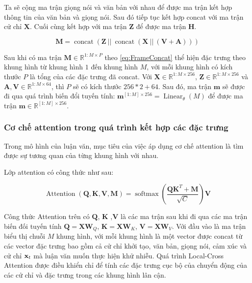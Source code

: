 Ta sẽ cộng ma trận giọng nói và văn bản với nhau để được ma trận kết hợp thông tin của văn bản và giọng nói. Sau đó tiếp tục kết hợp concat với ma trận cử chỉ $\mathbf{X}$. Cuối cùng kết hợp với ma trận $\mathbf{Z}$ để được ma trận $\mathbf{H}$.

\begin{equation}
	\label{eq:FrameConcat}
	\mathbf{M} = \operatorname{concat}( \mathbf{Z}\  || \   \operatorname{concat}(\mathbf{X}\ || \  (\mathbf{V} + \mathbf{A}) ) )
\end{equation}

Sau khi có ma trận $\mathbf{M} \in \mathbb{R}^{1:M \times P}$ theo \autoref{eq:FrameConcat} thể hiện đặc trưng theo khung hình từ khung hình $1$ đến khung hình $M$, với mỗi khung hình có kích thước $P$ là tổng của các đặc trưng đã concat. Với $\mathbf{X} \in \mathbb{R}^{1:M \times 256}$, $\mathbf{Z} \in \mathbb{R}^{1:M \times 256}$ và $\mathbf{A}, \mathbf{V} \in \mathbb{R}^{1:M \times 64}$, thì $P$ sẽ có kích thước $256 * 2 + 64$. Sau đó, ma trận $\mathbf{m}$ sẽ được đi qua quá trình biến đổi tuyến tính: $\mathbf{m}^{[1:M] \times 256} = \operatorname{Linear}_{\theta}(M)$ để được ma trận $\mathbf{m} \in \mathbb{R}^{[1:M] \times 256}$.

\subsubsection{Cơ chế attention trong quá trình kết hợp các đặc trưng}

Trong mô hình của luận văn, mục tiêu của việc áp dụng cơ chế attention là tìm được sự tương quan của từng khung hình với nhau.

Lớp attention có công thức như sau:

\begin{equation} \label{eq:attention}
	\operatorname{Attention}(\mathbf{Q}, \mathbf{K}, \mathbf{V}, \mathbf{M})=\operatorname{softmax}\left(\frac{\mathbf{Q} \mathbf{K}^{T}+\mathbf{M}}{\sqrt{C}}\right) \mathbf{V}
\end{equation}

Công thức Attention trên có $\mathbf{Q}$, $\mathbf{K}$ ,$\mathbf{V}$ là các ma trận sau khi đi qua các ma trận biến đối tuyến tính $\mathbf{Q} = \mathbf{X} \mathbf{W}_Q$, $\mathbf{K} = \mathbf{X} \mathbf{W}_K$, $\mathbf{V} = \mathbf{X} \mathbf{W}_V$. Với đầu vào là ma trận biểu thị chuỗi $M$ khung hình, với mỗi khung hình là một vector được concat từ các vector đặc trưng bao gồm cả cử chỉ khởi tạo, văn bản, giọng nói, cảm xúc và cử chỉ $\mathbf{x}_t$ mà luận văn muốn thực hiện khử nhiễu. Quá trình Local-Cross Attention được điều khiển chỉ để tính các đặc trưng cục bộ của chuyển động của các cử chỉ và đặc trưng trong các khung hình lân cận.

